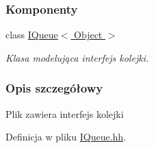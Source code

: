 \subsubsection*{Komponenty}
\begin{DoxyCompactItemize}
\item 
class \hyperlink{class_i_queue}{I\-Queue$<$ Object $>$}
\begin{DoxyCompactList}\small\item\em Klasa modelująca interfejs kolejki. \end{DoxyCompactList}\end{DoxyCompactItemize}


\subsubsection{Opis szczegółowy}
Plik zawiera interfejs kolejki 

Definicja w pliku \hyperlink{_i_queue_8hh_source}{I\-Queue.\-hh}.


